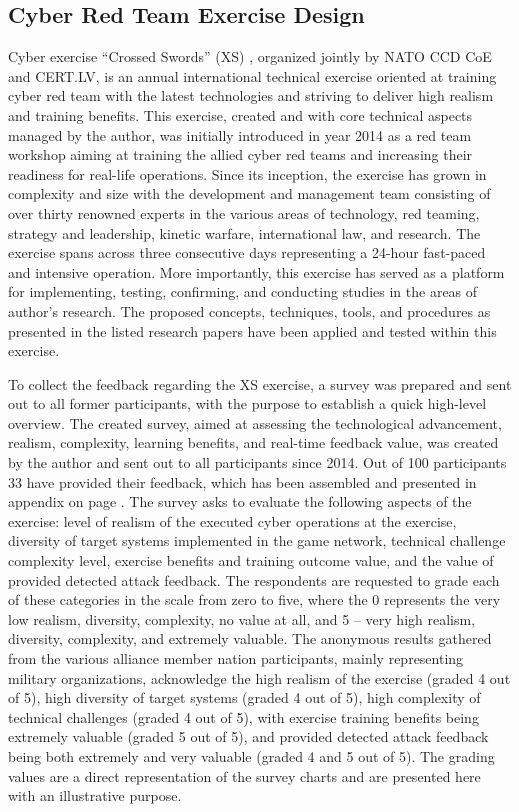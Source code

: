 \subsection{Cyber Red Team Exercise Design}
\label{sec:xs}
Cyber exercise ``Crossed Swords'' (XS) \cite{XS18}, organized jointly by NATO CCD CoE and CERT.LV, is an annual international technical exercise oriented at training cyber red team with the latest technologies and striving to deliver high realism and training benefits. This exercise, created and with core technical aspects managed by the author, was initially introduced in year 2014 as a red team workshop aiming at training the allied cyber red teams and increasing their readiness for real-life operations. Since its inception, the exercise has grown in complexity and size with the development and management team consisting of over thirty renowned experts in the various areas of technology, red teaming, strategy and leadership, kinetic warfare, international law, and research. The exercise spans across three consecutive days representing a 24-hour fast-paced and intensive operation.
More importantly, this exercise has served as a platform for implementing, testing, confirming, and conducting studies in the areas of author's research. The proposed concepts, techniques, tools, and procedures as presented in the listed research papers have been applied and tested within this exercise.

To collect the feedback regarding the XS exercise, a survey was prepared and sent out to all former participants, with the purpose to establish a quick high-level overview.
The created survey, aimed at assessing the technological advancement, realism, complexity, learning benefits, and real-time feedback value, was created by the author and sent out to all participants since 2014. Out of 100 participants 33 have provided their feedback, which has been assembled and presented in appendix on page \pageref{app:survey}.
The survey asks to evaluate the following aspects of the exercise: level of realism of the executed cyber operations at the exercise, diversity of target systems implemented in the game network, technical challenge complexity level, exercise benefits and training outcome value, and the value of provided detected attack feedback. The respondents are requested to grade each of these categories in the scale from zero to five, where the 0 represents the very low realism, diversity, complexity, no value at all, and 5 -- very high realism, diversity, complexity, and extremely valuable.
The anonymous results gathered from the various alliance member nation participants, mainly representing military organizations, acknowledge the high realism of the exercise (graded 4 out of 5), high diversity of target systems (graded 4 out of 5), high complexity of technical challenges (graded 4 out of 5), with exercise training benefits being extremely valuable (graded 5 out of 5), and provided detected attack feedback being both extremely and very valuable (graded 4 and 5 out of 5). The grading values are a direct representation of the survey charts and are presented here with an illustrative purpose.


